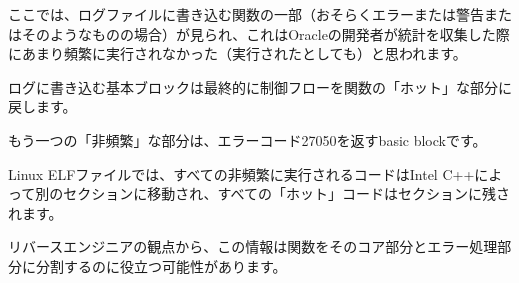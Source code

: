 ここでは、ログファイルに書き込む関数の一部（おそらくエラーまたは警告またはそのようなものの場合）が見られ、これはOracleの開発者が統計を収集した際にあまり頻繁に実行されなかった（実行されたとしても）と思われます。

ログに書き込む基本ブロックは最終的に制御フローを関数の「ホット」な部分に戻します。

もう一つの「非頻繁」な部分は、エラーコード27050を返す\gls{basic block}です。

Linux ELFファイルでは、すべての非頻繁に実行されるコードはIntel C++によって別のセクションに移動され、すべての「ホット」コードはセクションに残されます。

リバースエンジニアの観点から、この情報は関数をそのコア部分とエラー処理部分に分割するのに役立つ可能性があります。